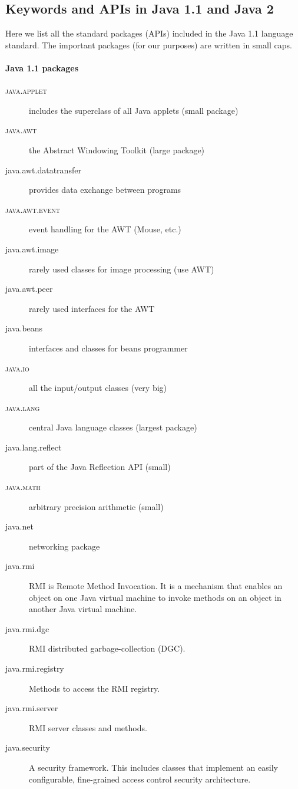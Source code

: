 \subsection{Keywords and APIs in Java 1.1 and Java 2}

Here we list all the standard packages (APIs) included in the Java 1.1
language standard. The important packages (for our purposes) are
written in small caps.

\paragraph{Java 1.1 packages}
\begin{description}
\item[\textsc{java.applet}] includes the superclass of all Java applets (small package)
\item[\textsc{java.awt}] the Abstract Windowing Toolkit (large package)
\item[java.awt.datatransfer] provides data exchange between programs
\item[\textsc{java.awt.event}] event handling for the AWT (Mouse, etc.)
\item[java.awt.image] rarely used classes for image processing (use AWT) 
\item[java.awt.peer] rarely used interfaces for the AWT
\item[java.beans] interfaces and classes for beans programmer
\item[\textsc{java.io}] all the input/output classes (very big)
\item[\textsc{java.lang}]  central Java language classes (largest package)
\item[java.lang.reflect] part of the Java Reflection API (small)
\item[\textsc{java.math}] arbitrary precision arithmetic (small)
\item[java.net] networking package
\item[java.rmi] RMI is Remote Method Invocation. It is a mechanism that enables an object on one Java virtual machine to invoke methods on an object in another Java virtual machine. 
\item[java.rmi.dgc] RMI distributed garbage-collection (DGC). 
\item[java.rmi.registry] Methods to access the RMI registry.
\item[java.rmi.server] RMI server classes and methods.
\item[java.security] A security framework. This includes classes that implement an easily configurable, fine-grained access control security architecture.

\end{description}
